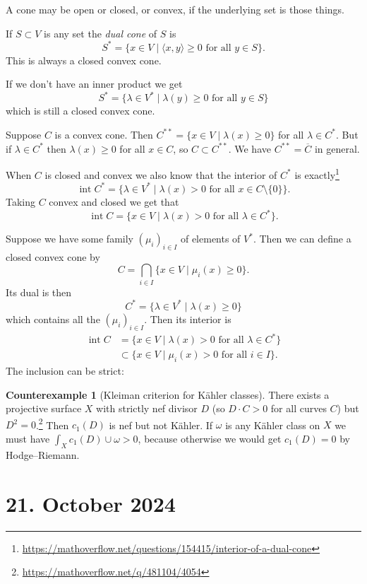 \documentclass[11pt]{amsart}
\theoremstyle{definition}
\newtheorem{cexam}[theo]{Counterexample}
\def\ov#1{\overline{#1}}
\def\<{\langle}
\def\>{\rangle}
\begin{document}
A cone may be open or closed, or convex, if the underlying set is those things.

If $S \subset V$ is any set the \emph{dual cone} of $S$ is
\[
S^* = \{ x \in V \mid \<x, y\> \geq 0 \text{ for all $y \in S$} \}.
\]
This is always a closed convex cone.

If we don't have an inner product we get
\[
S^* = \{ \lambda \in V^* \mid \lambda(y) \geq 0 \text{ for all $y \in S$}\}
\]
which is still a closed convex cone.

Suppose $C$ is a convex cone.
Then $C^{**} = \{ x \in V \mid \lambda(x) \geq 0 \}$ for all $\lambda \in C^*$.
But if $\lambda \in C^*$ then $\lambda(x) \geq 0$ for all $x \in C$, so $C \subset C^{**}$.
We have $C^{**} = \ov{C}$ in general.

When $C$ is closed and convex we also know that the interior of $C^*$ is exactly\footnote{\url{https://mathoverflow.net/questions/154415/interior-of-a-dual-cone}}
\[
\operatorname{int} C^*
= \{ \lambda \in V^* \mid \lambda(x) > 0 \text{ for all $x\in C \setminus \{0\}$}\}.
\]
Taking $C$ convex and closed we get that 
\[
\operatorname{int} C
= \{ x \in V \mid \lambda(x) > 0 \text{ for all $\lambda \in C^*$} \}.
\]

Suppose we have some family $(\mu_i)_{i \in I}$ of elements of $V^*$.
Then we can define a closed convex cone by
\[
C = \bigcap_{i \in I} \{ x \in V \mid \mu_i(x) \geq 0 \}.
\]
Its dual is then
\[
C^* = \{ \lambda \in V^* \mid \lambda(x) \geq 0 \}
\]
which contains all the $(\mu_i)_{i \in I}$.
Then its interior is
\begin{align*}
\operatorname{int} C 
&= \{ x \in V \mid \lambda(x) > 0 \text{ for all $\lambda \in C^*$} \}
\\
&\subset \{ x \in V \mid \mu_i(x) > 0 \text{ for all $i \in I$} \}.
\end{align*}
The inclusion can be strict:

\begin{cexam}[Kleiman criterion for K\"ahler classes]
\label{counter:kleiman-kahler}
There exists a projective surface $X$ with strictly nef divisor $D$ (so $D \cdot C > 0$ for all curves $C$) but $D^2 = 0$.\footnote{\url{https://mathoverflow.net/q/481104/4054}}
Then $c_1(D)$ is nef but not K\"ahler.
If $\omega$ is any K\"ahler class on $X$ we must have $\int_X c_1(D) \cup \omega > 0$, because otherwise we would get $c_1(D) = 0$ by Hodge--Riemann.
\end{cexam}




\section{21. October 2024}
\end{document}
